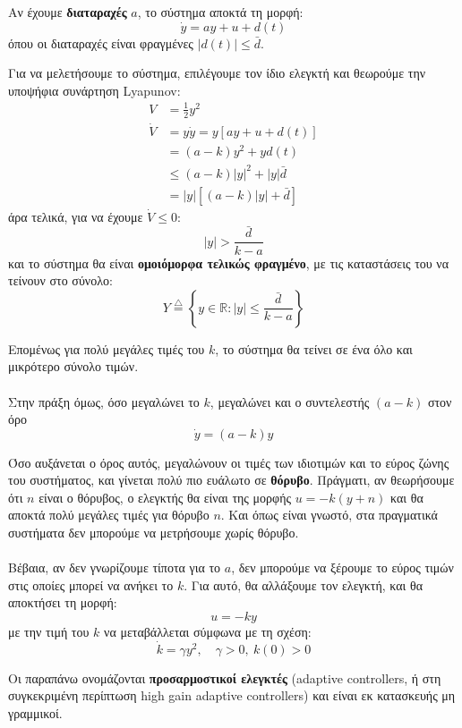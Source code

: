 \documentclass[11pt,a4paper,notitlepage,fleqn]{article}
\begin{document}
Αν έχουμε \textbf{διαταραχές} \( a \), το σύστημα αποκτά τη μορφή:
\[
\dot y = ay + u + d(t)
\]
όπου οι διαταραχές είναι φραγμένες \( \left|d(t)\right|\leq \bar d \).

Για να μελετήσουμε το σύστημα, επιλέγουμε τον ίδιο ελεγκτή και θεωρούμε την υποψήφια συνάρτηση Lyapunov:
\begin{align*}
	V &= \frac{1}{2} y^2 \\
	\dot V &= y\dot y = y\left[ ay + u + d(t) \right]
	\\ &= (a-k)y^2 + yd(t) \\
	&\leq (a-k)|y|^2 + |y|\bar{d}
	\\ &= |y|\left[ (a-k)|y| + \bar d \right]
\end{align*}
άρα τελικά, για να έχουμε \( \dot V \leq 0 \):
\[
|y| > \frac{\bar d}{k-a}
\]
και το σύστημα θα είναι \textbf{ομοιόμορφα τελικώς φραγμένο}, με τις καταστάσεις του να τείνουν στο σύνολο:
\[
Y \overset{\triangle}{=} \left\lbrace 
y \in \mathbb R: |y| \leq \frac{\bar{d}}{k-a}
 \right\rbrace
\]

Επομένως για πολύ μεγάλες τιμές του \( k \), το σύστημα θα τείνει σε ένα
όλο και μικρότερο σύνολο τιμών.

\paragraph{}
Στην πράξη όμως, όσο μεγαλώνει το \( k \), μεγαλώνει και ο συντελεστής
\( (a-k) \) στον όρο
\[
\dot y = (a-k) y
\]

Όσο αυξάνεται ο όρος αυτός, μεγαλώνουν οι τιμές των ιδιοτιμών και το εύρος ζώνης του συστήματος, και γίνεται πολύ πιο ευάλωτο σε \textbf{θόρυβο}. Πράγματι, αν θεωρήσουμε ότι \( n \) είναι ο θόρυβος, ο ελεγκτής θα είναι της μορφής \( u = -k(y+n) \) και θα αποκτά πολύ μεγάλες τιμές για θόρυβο
\( n \). Και όπως είναι γνωστό, στα πραγματικά συστήματα δεν μπορούμε να μετρήσουμε χωρίς θόρυβο.

\paragraph{}
Βέβαια, αν δεν γνωρίζουμε τίποτα για το \( a \), δεν μπορούμε να ξέρουμε
το εύρος τιμών στις οποίες μπορεί να ανήκει το \( k \). Για αυτό, θα
αλλάξουμε τον ελεγκτή, και θα αποκτήσει τη μορφή:
\[
u = -ky
\]
με την τιμή του \( k \) να μεταβάλλεται σύμφωνα με τη σχέση:
\[
\dot k = γy^2,\quad \gamma>0,\ k(0) > 0
\]

Οι παραπάνω ονομάζονται \textbf{προσαρμοστικοί ελεγκτές} (adaptive controllers, ή στη συγκεκριμένη περίπτωση high gain adaptive controllers)
και είναι εκ κατασκευής μη γραμμικοί.
\end{document}
